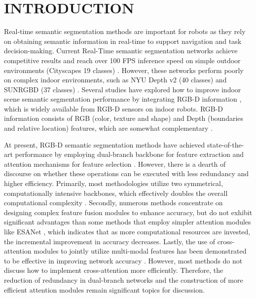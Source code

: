\documentclass[letterpaper, 10 pt, conference]{ieeeconf}
\begin{document}
\section{INTRODUCTION}
Real-time semantic segmentation methods are important for robots as they rely on obtaining semantic information in real-time to support navigation and task decision-making. Current Real-Time semantic segmentation networks achieve competitive results and reach over 100 FPS inference speed on simple outdoor environments (Cityscapes 19 classes) \cite{zhao2017pyramid,chen2017rethinking,yu2018bisenet,yu2021bisenet}. However, these networks perform poorly on complex indoor environments, such as NYU Depth v2 (40 classes) \cite{silberman2012indoor} and SUNRGBD (37 classes) \cite{song2015sun}. Several studies have explored how to improve indoor scene semantic segmentation performance by integrating RGB-D information \cite{cao2021shapeconv,liu2022cmx,seichter2021efficient,zhou2022frnet}, which is widely available from RGB-D sensors on indoor robots. RGB-D information consists of RGB (color, texture and shape) and Depth (boundaries and relative location) features, which are somewhat complementary \cite{cao2021shapeconv,liu2022cmx}. 



At present, RGB-D semantic segmentation methods have achieved state-of-the-art performance by employing dual-branch backbone for feature extraction and attention mechanisms for feature selection \cite{liu2022cmx}. However, there is a dearth of discourse on whether these operations can be executed with less redundancy and higher efficiency. Primarily, most methodologies utilize two symmetrical, computationally intensive backbones, which effectively doubles the overall computational complexity \cite{du2022pscnet}. Secondly, numerous methods concentrate on designing complex feature fusion modules to enhance accuracy, but do not exhibit significant advantages than some methods that employ simpler attention modules like ESANet \cite{seichter2021efficient}, which indicates that as more computational resources are invested, the incremental improvement in accuracy decreases. Lastly, the use of cross-attention modules to jointly utilize multi-modal features has been demonstrated to be effective in improving network accuracy \cite{liu2022cmx,zhou2022canet}. However, most methods do not discuss how to implement cross-attention more efficiently. Therefore, the reduction of redundancy in dual-branch networks and the construction of more efficient attention modules remain significant topics for discussion.
\end{document}

